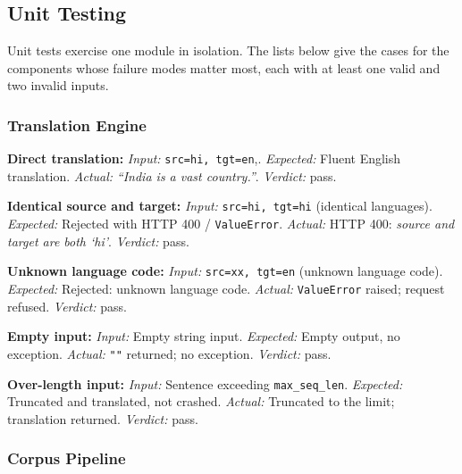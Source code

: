 \subsection{Unit Testing}
\label{subsec:unittest}

Unit tests exercise one module in isolation. The lists below give the cases
for the components whose failure modes matter most, each with at least one valid
and two invalid inputs.

\subsubsection{Translation Engine}

\begin{bullets}
\item \textbf{Direct translation:} \emph{Input:} \texttt{src=hi, tgt=en},\newline {}. \emph{Expected:} Fluent English translation. \emph{Actual:} \textit{``India is a vast country.''}. \emph{Verdict:} pass.
\item \textbf{Identical source and target:} \emph{Input:} \texttt{src=hi, tgt=hi} (identical languages). \emph{Expected:} Rejected with HTTP 400 / \texttt{ValueError}. \emph{Actual:} HTTP 400: \textit{source and target are both `hi'}. \emph{Verdict:} pass.
\item \textbf{Unknown language code:} \emph{Input:} \texttt{src=xx, tgt=en} (unknown language code). \emph{Expected:} Rejected: unknown language code. \emph{Actual:} \texttt{ValueError} raised; request refused. \emph{Verdict:} pass.
\item \textbf{Empty input:} \emph{Input:} Empty string input. \emph{Expected:} Empty output, no exception. \emph{Actual:} \texttt{""} returned; no exception. \emph{Verdict:} pass.
\item \textbf{Over-length input:} \emph{Input:} Sentence exceeding \texttt{max\_seq\_len}. \emph{Expected:} Truncated and translated, not crashed. \emph{Actual:} Truncated to the limit; translation returned. \emph{Verdict:} pass.
\end{bullets}

\subsubsection{Corpus Pipeline}

